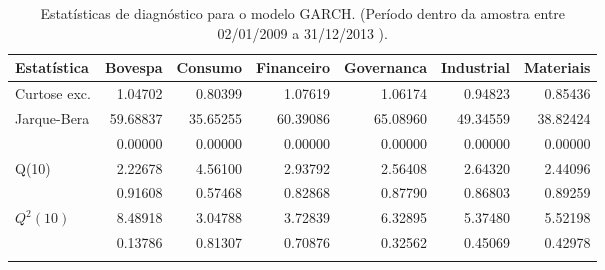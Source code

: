 \begin{longtable}{lrrrrrr}
\caption{Estatísticas de diagnóstico para o modelo GARCH. 
               (Período dentro da amostra entre 02/01/2009 a 31/12/2013 ).} \\ 
  \toprule
Estatística & Bovespa & Consumo & Financeiro & Governanca & Industrial & Materiais \\ 
  \midrule
Curtose exc. & 1.04702 & 0.80399 & 1.07619 & 1.06174 & 0.94823 & 0.85436 \\ 
  Jarque-Bera & 59.68837 & 35.65255 & 60.39086 & 65.08960 & 49.34559 & 38.82424 \\ 
   & 0.00000 & 0.00000 & 0.00000 & 0.00000 & 0.00000 & 0.00000 \\ 
  Q(10) & 2.22678 & 4.56100 & 2.93792 & 2.56408 & 2.64320 & 2.44096 \\ 
   & 0.91608 & 0.57468 & 0.82868 & 0.87790 & 0.86803 & 0.89259 \\ 
  $Q^2(10)$ & 8.48918 & 3.04788 & 3.72839 & 6.32895 & 5.37480 & 5.52198 \\ 
   & 0.13786 & 0.81307 & 0.70876 & 0.32562 & 0.45069 & 0.42978 \\ 
   \bottomrule
\label{tab:garchstats}
\end{longtable}
